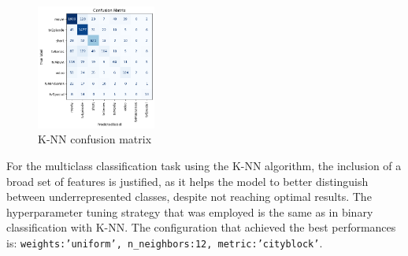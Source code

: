 


\begin{figure}
    \centering
    \includegraphics[width=0.35\textwidth]{plots/knn_multiclass_confmatrix.png}
    \caption{K-NN confusion matrix}
    \label{fig:multiclass_knn_confusion_matrix}
\end{figure}
For the multiclass classification task using the K-NN algorithm, the inclusion of a broad set of 
features is justified, as it helps the model to better distinguish between 
underrepresented classes, despite not reaching optimal results. 
The hyperparameter tuning strategy that was employed is the same as in binary classification with K-NN. 
The configuration that achieved the best performances is: \texttt{{weights:'uniform', n\_neighbors:12, metric:'cityblock'}}.\\ 

